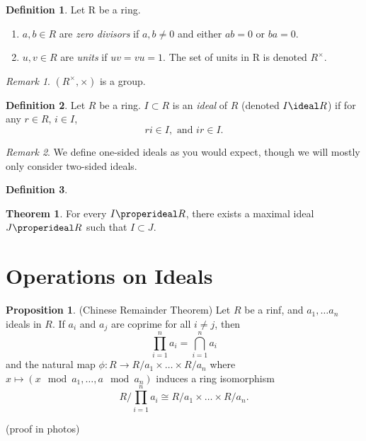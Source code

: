 \documentclass[a5paper]{article}
\theoremstyle{definition}%
\newtheorem*{theorem*}{Theorem} %
\newtheorem*{proposition*}{Proposition}
\newtheorem*{definition*}{Definition}
\numberwithin{exercise}{section}
\theoremstyle{remark}%
\newtheorem*{remark*}{Remark}
\begin{document}
\begin{definition*}
Let R be a ring. 
\begin{enumerate}
\item $a,b\in R$ are \emph{zero divisors} if $a,b\neq0$ and either $ab = 0$ or $ba = 0$. 
\item $u,v \in R$ are \emph{units} if $u v = vu = 1$. The set of units in R is denoted $R^\times$. 
\end{enumerate}
\end{definition*}

\begin{remark*}
$(R^\times, \times)$ is a group. 
\end{remark*}


\begin{highlight}
\begin{definition*}
Let $R$ be a ring. $I\subset R$ is an \emph{ideal} of $R$ (denoted $I\ideal R$) if for any $r\in R$, $i\in I$, 
$$ri\in I,  \text{ and }  ir\in I.$$
\end{definition*}
\end{highlight}
\begin{remark*}
We define one-sided ideals as you would expect, though we will mostly only consider two-sided ideals. 
\end{remark*}

\begin{highlight}
\begin{definition*}

\end{definition*}
\end{highlight}

\begin{highlight}
\begin{theorem*}
For every $I\properideal R$, there exists a maximal ideal $J\properideal R$ such that $I\subset J$. 
\end{theorem*}
\end{highlight}

\section*{Operations on Ideals}

\begin{proposition*}(Chinese Remainder Theorem)
Let $R$ be a rinf, and $a_1, \dots a_n$ ideals in $R$. If $a_i$ and $a_j$ are coprime for all $i\neq j $, then 
$$\prod_{i=1}^n a_i = \bigcap_{i=1}^n a_i$$
and the natural map $\phi:R\to R/a_1 \times \dots \times R/a_n$ where $x\mapsto (x\mod a_1, \dots, a\mod a_n)$ induces a ring isomorphism 
$$R/\prod_{i=1}^n a_i \cong R/a_1 \times \dots \times R/a_n. $$

(proof in photos) 
\end{proposition*}
\end{document}
